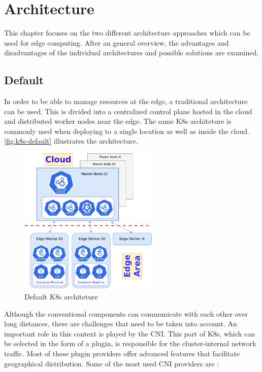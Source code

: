 \documentclass[MIC,Master,english]{twbook}%
\begin{document}
\section{Architecture}
\label{sec:architecture}
This chapter focuses on the two different architecture approaches which can be used for edge computing. After an general overview, the advantages and disadvantages of the individual architectures and possible solutions are examined.

\subsection{Default}
\label{sec:arch-default}
In order to be able to manage resources at the edge, a traditional architecture can be used. This is divided into a centralized control plane hosted in the cloud and distributed worker nodes near the edge. The same \ac{K8s} architeture is commonly used when deploying to a single location as well as inside the cloud. \autoref{fig:k8s-default} illustrates the architecture.

\begin{figure}[ht]
    \centering
    \includegraphics[width=0.60\textwidth]{PICs/drawio/defaul-k8s.drawio.pdf}
    \caption{Default \ac{K8s} architeture}
    \label{fig:k8s-default}
\end{figure}

Although the conventional components can communicate with each other over long distances, there are challenges that need to be taken into account. An important role in this context is played by the \ac{CNI}. This part of \ac{K8s}, which can be selected in the form of a plugin, is responsible for the cluster-internal network traffic. Most of these plugin providers offer advanced features that facilitate geographical distribution. Some of the most used \ac{CNI} providers are \cite{k8s-cni}:
\end{document}
